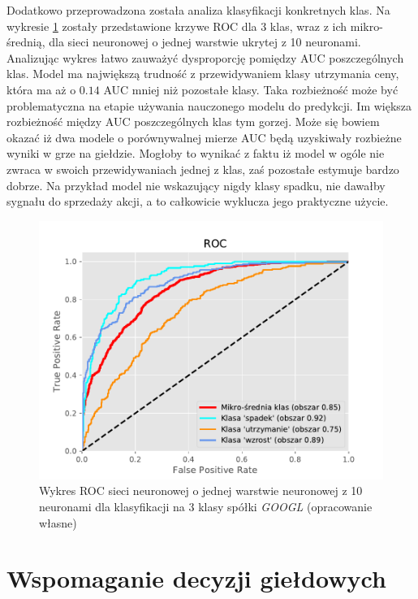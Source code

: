 \documentclass[a4paper, twoside, 11pt, openright]{article}
\begin{document}
Dodatkowo przeprowadzona została analiza klasyfikacji konkretnych klas. Na wykresie \ref{img:nn_roc_auc_discrete} zostały przedstawione krzywe ROC dla 3 klas, wraz z ich mikro-średnią, dla sieci neuronowej o jednej warstwie ukrytej z 10 neuronami. Analizując wykres łatwo zauważyć dysproporcję pomiędzy AUC poszczególnych klas. Model ma największą trudność z przewidywaniem klasy utrzymania ceny, która ma aż o $0.14$ AUC mniej niż pozostałe klasy. Taka rozbieżność może być problematyczna na etapie używania nauczonego modelu do predykcji. Im większa rozbieżność między AUC poszczególnych klas tym gorzej. Może się bowiem okazać iż dwa modele o porównywalnej mierze AUC będą uzyskiwały rozbieżne wyniki w grze na giełdzie. Mogłoby to wynikać z faktu iż model w ogóle nie zwraca w swoich przewidywaniach jednej z klas, zaś pozostałe estymuje bardzo dobrze. Na przykład model nie wskazujący nigdy klasy spadku, nie dawałby sygnału do sprzedaży akcji, a to całkowicie wyklucza jego praktyczne użycie. 

\begin{figure}[H]
\centering \includegraphics[scale=0.8]{img/nn_layers_10_discrete_roc-googl.pdf}
\caption{Wykres ROC sieci neuronowej o jednej warstwie neuronowej z 10 neuronami dla klasyfikacji na 3 klasy spółki \textit{GOOGL} (opracowanie własne)}
\label{img:nn_roc_auc_discrete}
\end{figure}



\section{Wspomaganie decyzji giełdowych}
\end{document}

